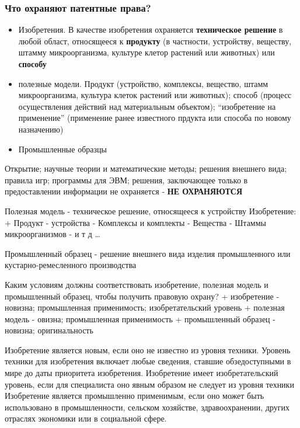 \documentclass[12pt]{article}
\begin{document}
\hypertarget{ux447ux442ux43e-ux43eux445ux440ux430ux43dux44fux44eux442-ux43fux430ux442ux435ux43dux442ux43dux44bux435-ux43fux440ux430ux432ux430}{%
\subsubsection{Что охраняют патентные
права?}\label{ux447ux442ux43e-ux43eux445ux440ux430ux43dux44fux44eux442-ux43fux430ux442ux435ux43dux442ux43dux44bux435-ux43fux440ux430ux432ux430}}

\begin{itemize}
\item
  Изобретения. В качестве изобретения охраняется \textbf{техническое
  решение} в любой област, относящееся к \textbf{продукту} (в частности,
  устройству, веществу, штамму микроорганизма, культуре клетор растений
  или животных) или \textbf{способу}
\item
  полезные модели. Продукт (устройство, комплексы, вещество, штамм
  микроорганизма, культура клеток растений или животных); способ
  (процесс осуществления действий над материальным объектом);
  ``изобретение на применение'' (применение ранее известного прдукта или
  способа по новому назначению)
\item
  Промышленные образцы
\end{itemize}

Открытие; научные теории и математические методы; решения внешнего вида;
правила игр; программы для ЭВМ; решения, заключающее только в
предоставлении информации не охраняется - \textbf{НЕ ОХРАНЯЮТСЯ}

Полезная модель - техническое решение, относящееся к устройству
Изобретение: + Продукт - устройства - Комплексы и комплекты - Вещества -
Штаммы микроорганизмов - и т д \ldots{}

Промышленный образец - решение внешнего вида изделия промышленного или
кустарно-ремесленного производства

Каким условиям должны соответствовать изобретение, полезная модель и
промышленный образец, чтобы получить правовую охрану? + изобретение -
новизна; промышленная применимость; изобретательский уровень + полезная
модель - овизна; промышленная применимость + промышленный образец -
новизна; оригинальность

Изобретение является новым, если оно не известно из уровня техники.
Уровень техники для изобретения включает любые сведения, ставшие
обзедоступными в мире до даты приоритета изобретения. Изобретение имеет
изобретательский уровень, если для специалиста оно явным образом не
следует из уровня техники Изобретение является промышленно применимым,
если оно может быть использовано в промышленности, сельском хозяйстве,
здравоохранении, других отраслях экономики или в социальной сфере.
\end{document}

